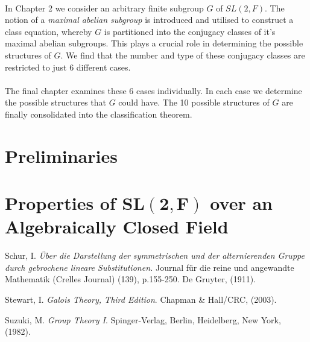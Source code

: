 \documentclass[a4paper , 11pt]{book}
\theoremstyle{definition}
\theoremstyle{remark}
\begin{document}
\vspace{-0.2mm}
\\
In Chapter 2 we consider an arbitrary finite subgroup $G$ of $SL(2,F)$. The notion of a \textit{maximal abelian subgroup} is introduced and utilised to construct a class equation, whereby $G$ is partitioned into the conjugacy classes of it's maximal abelian subgroups. This plays a crucial role in determining the possible structures of $G$. We find that the number and type of these conjugacy classes are restricted to just 6 different cases. \\
\vspace{-0.2mm}
\\
The final chapter examines these 6 cases individually. In each case we determine the possible structures that $G$ could have. The 10 possible structures of $G$ are finally consolidated into the classification theorem.


\newpage\phantom{blabla}
\thispagestyle{plain}

\chapter[Preliminaries]{Preliminaries}


\chapter[Properties of $\pmb{SL(2,F)}$ over an Algebraically Closed Field]{Properties of $\pmb{SL(2,F)}$ over an Algebraically Closed Field}








\begin{thebibliography}{9}










Schur, I. 
\textit{Über die Darstellung der symmetrischen und der alternierenden Gruppe durch gebrochene lineare Substitutionen.} Journal für die reine und angewandte Mathematik (Crelles Journal) (139), p.155-250. 
De Gruyter,
(1911).

Stewart, I. 
\textit{Galois Theory, Third Edition}. 
Chapman \& Hall/CRC,
(2003).

Suzuki, M. 
\textit{Group Theory I}. 
Spinger-Verlag, Berlin, Heidelberg, New York, 
(1982).

\end{thebibliography}
\end{document}
